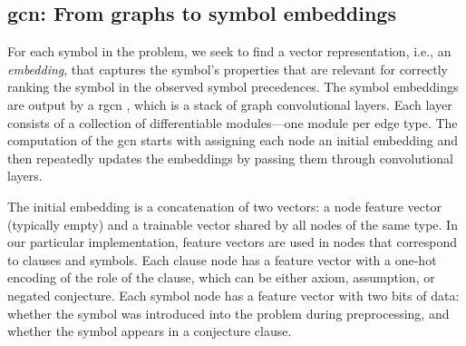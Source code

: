 \subsection{\Gls{gcn}: From graphs to symbol embeddings}
\label{sec:gcn}

For each symbol in the problem,
we seek to find a vector representation, i.e., an \emph{embedding},
that captures the symbol's properties that are relevant
for correctly ranking the symbol in the observed symbol precedences.
The symbol embeddings are output by a \gls{rgcn} \cite{Schlichtkrull2017},
which is a stack of graph convolutional layers.
Each layer consists of a collection of differentiable modules---one module per edge type.
The computation of the \gls{gcn} starts with assigning each node an initial embedding
and then repeatedly updates the embeddings by passing them through convolutional layers.

The initial embedding is a concatenation of two vectors:
a node feature vector (typically empty)
and a trainable vector shared by all nodes of the same type.
In our particular implementation,
feature vectors are used in nodes that correspond to clauses and symbols.
Each clause node has a feature vector with a one-hot encoding of the role of the clause,
which can be either axiom, assumption, or negated conjecture.
Each symbol node has a feature vector with two bits of data:
whether the symbol was introduced into the problem during preprocessing,
and whether the symbol appears in a conjecture clause.

